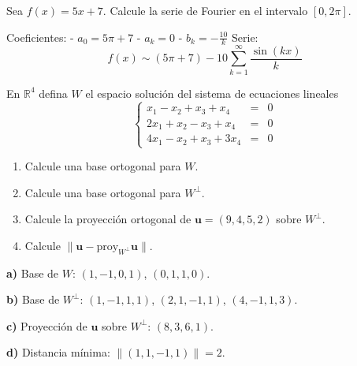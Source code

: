 \begin{prob}
Sea $f(x)=5x+7$. Calcule la serie de Fourier en el intervalo $[0,2\pi]$.
\begin{myproof}
Coeficientes:
- \( a_0 = 5\pi + 7 \)
- \( a_k = 0 \)
- \( b_k = -\frac{10}{k} \)
Serie:
\[
\boxed{f(x) \sim (5\pi + 7) - 10 \sum_{k=1}^{\infty} \frac{\sin(kx)}{k}}
\]
\end{myproof}
\end{prob}



\begin{prob}
En $\mathbb{R}^4$ defina $W$ el espacio solución del sistema de ecuaciones lineales
\[
\left\lbrace
\begin{array}{ccc}
x_1-x_2+x_3+x_4&=&0\\
2x_1+x_2-x_3+x_4&=&0\\
4x_1-x_2+x_3+3x_4&=&0
\end{array}
\right.
\]
\begin{enumerate}
\item Calcule una base ortogonal para $W$.
\item Calcule una base ortogonal para $W^{\perp}$.
\item Calcule la proyección ortogonal de $\mathbf{u}=(9,4,5,2)$ sobre $W^{\perp}$.
\item Calcule $\lVert \mathbf{u}-\text{proy}_{W^{\perp}}\mathbf{u}\rVert$.
\end{enumerate}
\begin{myproof}
\textbf{a)} Base de \( W \): \( (1, -1, 0, 1) \), \( (0, 1, 1, 0) \).

\textbf{b)} Base de \( W^\perp \): \( (1, -1, 1, 1) \), \( (2, 1, -1, 1) \), \( (4, -1, 1, 3) \).

\textbf{c)} Proyección de \( \mathbf{u} \) sobre \( W^\perp \): \( (8,3,6,1) \).

\textbf{d)} Distancia mínima: \( \|(1,1,-1,1)\| = 2 \).
\end{myproof}
\end{prob}



